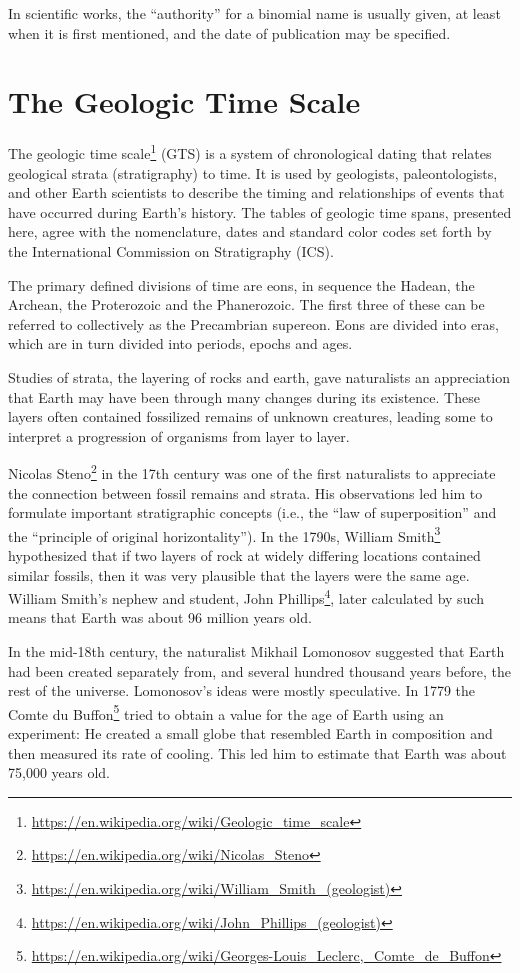 \documentclass[]{book}
\let\rmarkdownfootnote\footnote%
\def\footnote{\protect\rmarkdownfootnote}
\renewcommand{\href}[2]{#2\footnote{\url{#1}}}
\theoremstyle{definition}
\theoremstyle{definition}
\theoremstyle{definition}
\theoremstyle{remark}
\begin{document}
In scientific works, the ``authority'' for a binomial name is usually
given, at least when it is first mentioned, and the date of publication
may be specified.

\section{The Geologic Time Scale}\label{the-geologic-time-scale}

The \href{https://en.wikipedia.org/wiki/Geologic_time_scale}{geologic
time scale} (GTS) is a system of chronological dating that relates
geological strata (stratigraphy) to time. It is used by geologists,
paleontologists, and other Earth scientists to describe the timing and
relationships of events that have occurred during Earth's history. The
tables of geologic time spans, presented here, agree with the
nomenclature, dates and standard color codes set forth by the
International Commission on Stratigraphy (ICS).

The primary defined divisions of time are eons, in sequence the Hadean,
the Archean, the Proterozoic and the Phanerozoic. The first three of
these can be referred to collectively as the Precambrian supereon. Eons
are divided into eras, which are in turn divided into periods, epochs
and ages.

Studies of strata, the layering of rocks and earth, gave naturalists an
appreciation that Earth may have been through many changes during its
existence. These layers often contained fossilized remains of unknown
creatures, leading some to interpret a progression of organisms from
layer to layer.

\href{https://en.wikipedia.org/wiki/Nicolas_Steno}{Nicolas Steno} in the 17th century was one of the first naturalists to
appreciate the connection between fossil remains and strata. His
observations led him to formulate important stratigraphic concepts
(i.e., the ``law of superposition'' and the ``principle of original
horizontality''). In the 1790s, \href{https://en.wikipedia.org/wiki/William_Smith_(geologist)}{William Smith} hypothesized that if two
layers of rock at widely differing locations contained similar fossils,
then it was very plausible that the layers were the same age. William
Smith's nephew and student, \href{https://en.wikipedia.org/wiki/John_Phillips_(geologist)}{John Phillips}, later calculated by such
means that Earth was about 96 million years old.

In the mid-18th century, the naturalist Mikhail Lomonosov suggested that
Earth had been created separately from, and several hundred thousand
years before, the rest of the universe. Lomonosov's ideas were mostly
speculative. In 1779 the \href{https://en.wikipedia.org/wiki/Georges-Louis_Leclerc,_Comte_de_Buffon}{Comte du Buffon} tried to obtain a value for the
age of Earth using an experiment: He created a small globe that
resembled Earth in composition and then measured its rate of cooling.
This led him to estimate that Earth was about 75,000 years old.
\end{document}
